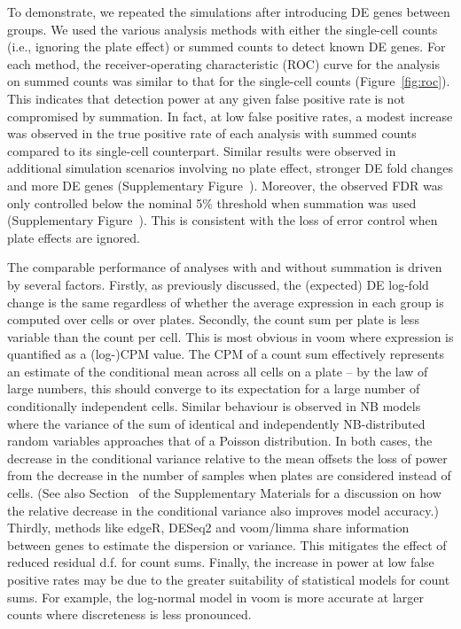 \documentclass[oupdraft]{bio}
\begin{document}
To demonstrate, we repeated the simulations after introducing DE genes between groups.
We used the various analysis methods with either the single-cell counts (i.e., ignoring the plate effect) or summed counts to detect known DE genes.
For each method, the receiver-operating characteristic (ROC) curve for the analysis on summed counts was similar to that for the single-cell counts (Figure~\ref{fig:roc}).
This indicates that detection power at any given false positive rate is not compromised by summation.
In fact, at low false positive rates, a modest increase was observed in the true positive rate of each analysis with summed counts compared to its single-cell counterpart.
Similar results were observed in additional simulation scenarios involving no plate effect, stronger DE fold changes and more DE genes (Supplementary Figure~\supppowerroc{}).
Moreover, the observed FDR was only controlled below the nominal 5\% threshold when summation was used (Supplementary Figure~\supppowerfdr{}).
This is consistent with the loss of error control when plate effects are ignored.

The comparable performance of analyses with and without summation is driven by several factors. 
Firstly, as previously discussed, the (expected) DE log-fold change is the same regardless of whether the average expression in each group is computed over cells or over plates. 
Secondly, the count sum per plate is less variable than the count per cell.
This is most obvious in voom where expression is quantified as a (log-)CPM value.
The CPM of a count sum effectively represents an estimate of the conditional mean across all cells on a plate -- by the law of large numbers, this should converge to its expectation for a large number of conditionally independent cells.
Similar behaviour is observed in NB models where the variance of the sum of identical and independently NB-distributed random variables approaches that of a Poisson distribution.
In both cases, the decrease in the conditional variance relative to the mean offsets the loss of power from the decrease in the number of samples when plates are considered instead of cells.
(See also Section~\suppmeanvar{} of the Supplementary Materials for a discussion on how the relative decrease in the conditional variance also improves model accuracy.)
Thirdly, methods like edgeR, DESeq2 and voom/limma share information between genes to estimate the dispersion or variance. 
This mitigates the effect of reduced residual d.f. for count sums.
Finally, the increase in power at low false positive rates may be due to the greater suitability of statistical models for count sums.
For example, the log-normal model in voom is more accurate at larger counts where discreteness is less pronounced.
\end{document}
